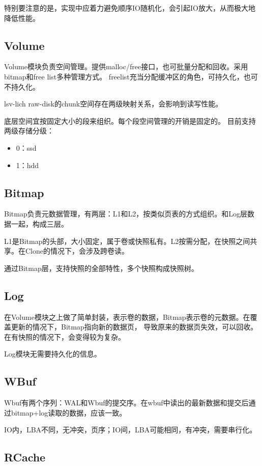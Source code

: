 \documentclass[UTF8]{ctexart}
\begin{document}
特别要注意的是，实现中应着力避免顺序IO随机化，会引起IO放大，从而极大地降低性能。


\subsection{Volume}

Volume模块负责空间管理。提供malloc/free接口，也可批量分配和回收。采用bitmap和free list多种管理方式。
freelist充当分配缓冲区的角色，可持久化，也可不持久化。

lsv-lich raw-disk的chunk空间存在两级映射关系，会影响到读写性能。

底层空间宜按固定大小的段来组织。每个段空间管理的开销是固定的。
目前支持两级存储分级：
\begin{itemize}
    \item 0：ssd
    \item 1：hdd
\end{itemize}

\subsection{Bitmap}

Bitmap负责元数据管理，有两层：L1和L2，按类似页表的方式组织。和Log层数据一起，构成三层。

L1是Bitmap的头部，大小固定，属于卷或快照私有。L2按需分配，在快照之间共享。在Clone的情况下，会涉及跨卷读。

通过Bitmap层，支持快照的全部特性，多个快照构成快照树。

\subsection{Log}

在Volume模块之上做了简单封装，表示卷的数据，Bitmap表示卷的元数据。在覆盖更新的情况下，Bitmap指向新的数据页，
导致原来的数据页失效，可以回收。在有快照的情况下，会变得较为复杂。

Log模块无需要持久化的信息。

\subsection{WBuf}

Wbuf有两个序列：WAL和Wbuf的提交序。在wbuf中读出的最新数据和提交后通过bitmap+log读取的数据，应该一致。

IO内，LBA不同，无冲突，页序；IO间，LBA可能相同，有冲突，需要串行化。

\subsection{RCache}
\end{document}

